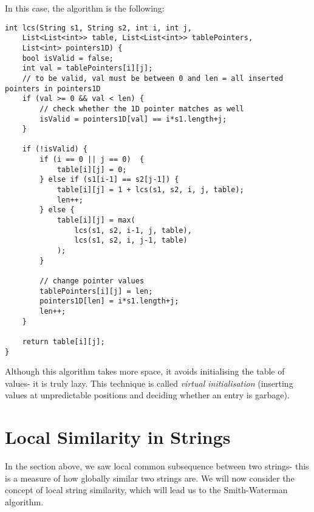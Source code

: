 \documentclass[a4paper, openany]{memoir}
\begin{document}
    In this case, the algorithm is the following:
\begin{lstlisting}[language=pseudocode]
int lcs(String s1, String s2, int i, int j,
    List<List<int>> table, List<List<int>> tablePointers, 
    List<int> pointers1D) {
    bool isValid = false;
    int val = tablePointers[i][j];
    // to be valid, val must be between 0 and len = all inserted pointers in pointers1D
    if (val >= 0 && val < len) {
        // check whether the 1D pointer matches as well
        isValid = pointers1D[val] == i*s1.length+j;
    }

    if (!isValid) {
        if (i == 0 || j == 0)  {
            table[i][j] = 0;
        } else if (s1[i-1] == s2[j-1]) {
            table[i][j] = 1 + lcs(s1, s2, i, j, table);
            len++;
        } else {
            table[i][j] = max(
                lcs(s1, s2, i-1, j, table), 
                lcs(s1, s2, i, j-1, table)
            );
        }

        // change pointer values
        tablePointers[i][j] = len;
        pointers1D[len] = i*s1.length+j;
        len++;
    }

    return table[i][j];
}
\end{lstlisting}
    Although this algorithm takes more space, it avoids initialising the table of values- it is truly lazy. This technique is called \emph{virtual initialisation} (inserting values at unpredictable positions and deciding whether an entry is garbage).
    \newpage

    \section{Local Similarity in Strings}
    In the section above, we saw local common subsequence between two strings- this is a measure of how globally similar two strings are. We will now consider the concept of local string similarity, which will lead us to the Smith-Waterman algorithm.
\end{document}
